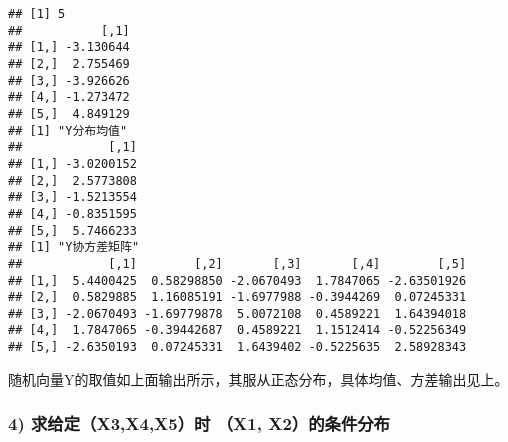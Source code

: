 \documentclass[
]{article}
\newenvironment{Shaded}{\begin{snugshade}}{\end{snugshade}}
\newcommand{\AttributeTok}[1]{\textcolor[rgb]{0.77,0.63,0.00}{#1}}
\newcommand{\CommentTok}[1]{\textcolor[rgb]{0.56,0.35,0.01}{\textit{#1}}}
\newcommand{\DecValTok}[1]{\textcolor[rgb]{0.00,0.00,0.81}{#1}}
\newcommand{\FunctionTok}[1]{\textcolor[rgb]{0.00,0.00,0.00}{#1}}
\newcommand{\NormalTok}[1]{#1}
\newcommand{\OtherTok}[1]{\textcolor[rgb]{0.56,0.35,0.01}{#1}}
\newcommand{\SpecialCharTok}[1]{\textcolor[rgb]{0.00,0.00,0.00}{#1}}
\newcommand{\StringTok}[1]{\textcolor[rgb]{0.31,0.60,0.02}{#1}}
\begin{document}
\begin{Shaded}
\end{Shaded}

\begin{verbatim}
## [1] 5
##           [,1]
## [1,] -3.130644
## [2,]  2.755469
## [3,] -3.926626
## [4,] -1.273472
## [5,]  4.849129
## [1] "Y分布均值"
##            [,1]
## [1,] -3.0200152
## [2,]  2.5773808
## [3,] -1.5213554
## [4,] -0.8351595
## [5,]  5.7466233
## [1] "Y协方差矩阵"
##            [,1]        [,2]       [,3]       [,4]        [,5]
## [1,]  5.4400425  0.58298850 -2.0670493  1.7847065 -2.63501926
## [2,]  0.5829885  1.16085191 -1.6977988 -0.3944269  0.07245331
## [3,] -2.0670493 -1.69779878  5.0072108  0.4589221  1.64394018
## [4,]  1.7847065 -0.39442687  0.4589221  1.1512414 -0.52256349
## [5,] -2.6350193  0.07245331  1.6439402 -0.5225635  2.58928343
\end{verbatim}

随机向量Y的取值如上面输出所示，其服从正态分布，具体均值、方差输出见上。

\hypertarget{ux6c42ux7ed9ux5b9ax3x4x5ux65f6-x1-x2ux7684ux6761ux4ef6ux5206ux5e03}{%
\subsubsection{\texorpdfstring{\textbf{4) 求给定（X3,X4,X5）时 （X1,
X2）的条件分布}}{4) 求给定（X3,X4,X5）时 （X1, X2）的条件分布}}\label{ux6c42ux7ed9ux5b9ax3x4x5ux65f6-x1-x2ux7684ux6761ux4ef6ux5206ux5e03}}
\end{document}

